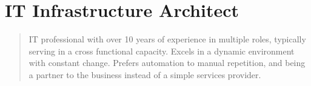 \section*{IT Infrastructure Architect}
\begin{quote}
IT professional with over 10 years of experience in multiple roles, typically serving in a cross functional capacity.  Excels in a dynamic environment with constant change.  Prefers automation to manual repetition, and being a partner to the business instead of a simple services provider.
\end{quote}

